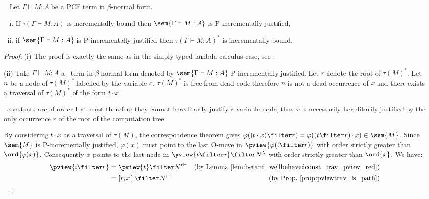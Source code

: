 \begin{proposition} \
\label{prop:incrbound_imp_incrjustified_pcf} Let $\Gamma \vdash M : A$ be a PCF term in $\beta$-normal form.
\begin{enumerate}[(i)]
\item  If $\tau(\Gamma \vdash M : A)$ is incrementally-bound then $\sem{\Gamma \vdash M : A}$ is P-incrementally justified,
\item  if $\sem{\Gamma \vdash M : A}$ is P-incrementally justified
then $\tau(\Gamma \vdash M : A)^*$ is incrementally-bound.
\end{enumerate}
\end{proposition}
\begin{proof}
(i) The proof is exactly the same as in the simply typed lambda calculus case,
see \cite[Proposition 4.1.5(i)]{blumtransfer}.

\noindent (ii)
Take $\Gamma \vdash M : A$ a \pcf\ term in $\beta$-normal form denoted by $\sem{\Gamma \vdash M : A}$ P-incrementally justified. Let $r$ denote the root of $\tau(M)^*$.
Let $n$ be a node of $\tau(M)^*$ labelled by the variable $x$.
$\tau(M)^*$ is free from dead code therefore $n$ is not a dead occurrence of $x$ and there exists a traversal of $\tau(M)^*$ of the form $t \cdot x$.

\pcf\ constants are of order $1$ at most therefore they cannot
hereditarily justify a variable node, thus $x$ is necessarily
hereditarily justified by the only occurrence $r$ of the root of the
computation tree.

By considering $t\cdot x$ as a traversal of $\tau(M)$,  the
correspondence theorem gives $\varphi((t \cdot x) \filter r) =
\varphi((t \filter r) \cdot x) \in \sem{M}$. Since $\sem{M}$ is
P-incrementally justified, $\varphi(x)$ must point to the last
O-move in $\pview{\varphi(t \filter r)}$ with order strictly greater
than $\ord{\varphi(x)}$. Consequently $x$ points to the last node in
$\pview{t \filter r} \filter N^{\lambda}$ with order strictly
greater than $\ord{x}$. We have:
\begin{align*}
\pview{t \filter r} &= \pview{t} \filter N^{r \vdash} & (\mbox{by Lemma \ref{lem:betanf_wellbehavedconst_trav_pview_red}}) \\
& = [r,x[ \ \filter N^{r \vdash} & (\mbox{by Prop.\ \ref{prop:pviewtrav_is_path}})
\end{align*}


\end{proof}
